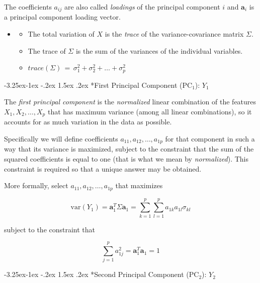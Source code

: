 \documentclass[]{book}
\makeatletter
\providecommand{\tightlist}{%
  \setlength{\itemsep}{0pt}\setlength{\parskip}{0pt}}
\newenvironment{rmdblock}[1]
  {\begin{shaded*}
  \begin{itemize}
  \renewcommand{\labelitemi}{
    \raisebox{-.7\height}[0pt][0pt]{
      {\setkeys{Gin}{width=2em,keepaspectratio}\texttt{[image: img/icons/\#1]}}
    }
  }
  \item
  }
  {
  \end{itemize}
  \end{shaded*}
  }
\newenvironment{rmdtip}
  {\begin{rmdblock}{tip}}
  {\end{rmdblock}}
\renewcommand\subsection{\@startsection{subsection}{2}{\z@}%
                                     {-3.25ex\@plus -1ex \@minus -.2ex}%
                                     {1.5ex \@plus .2ex}%
                                     {\normalfont\large\bfseries\color{Violet}}}
\theoremstyle{definition}
\theoremstyle{definition}
\theoremstyle{definition}
\theoremstyle{remark}
\makeatother
\begin{document}
The coefficients \(a_{ij}\) are also called \emph{loadings} of the
principal component \(i\) and \(\mathbf{a}_i\) is a principal component
loading vector.

\begin{rmdtip}
\begin{itemize}
\tightlist
\item
  The total variation of \(X\) is the \emph{trace} of the
  variance-covariance matrix \(\Sigma\).
\item
  The trace of \(\Sigma\) is the sum of the variances of the individual
  variables.
\item
  \(trace(\Sigma) \, = \, \sigma^2_1 + \sigma^2_2 + \dots +\sigma^2_p\)
\end{itemize}
\end{rmdtip}

\subsection*{\texorpdfstring{First Principal Component
(\(\text{PC}_1\)):
\(Y_1\)}{First Principal Component (\textbackslash{}text\{PC\}\_1): Y\_1}}\label{first-principal-component-textpc_1-y_1}

The \emph{first principal component} is the \emph{normalized} linear
combination of the features \(X_1,X_2,\ldots,X_p\) that has maximum
variance (among all linear combinations), so it accounts for as much
variation in the data as possible.

Specifically we will define coefficients \(a_{11},a_{12},\ldots,a_{1p}\)
for that component in such a way that its variance is maximized, subject
to the constraint that the sum of the squared coefficients is equal to
one (that is what we mean by \emph{normalized}). This constraint is
required so that a unique answer may be obtained.

More formally, select \(a_{11},a_{12},\ldots,a_{1p}\) that maximizes

\[ \text{var}(Y_1) = \mathbf{a}^T_1\Sigma\mathbf{a}_1  = \sum_{k=1}^{p}\sum_{l=1}^{p}a_{1k}a_{1l}\sigma_{kl} \]

subject to the constraint that

\[ \sum_{j=1}^{p}a^2_{1j} = \mathbf{a}^T_1\mathbf{a}_1   = 1 \]

\subsection*{\texorpdfstring{Second Principal Component
(\(\text{PC}_2\)):
\(Y_2\)}{Second Principal Component (\textbackslash{}text\{PC\}\_2): Y\_2}}\label{second-principal-component-textpc_2-y_2}
\end{document}
